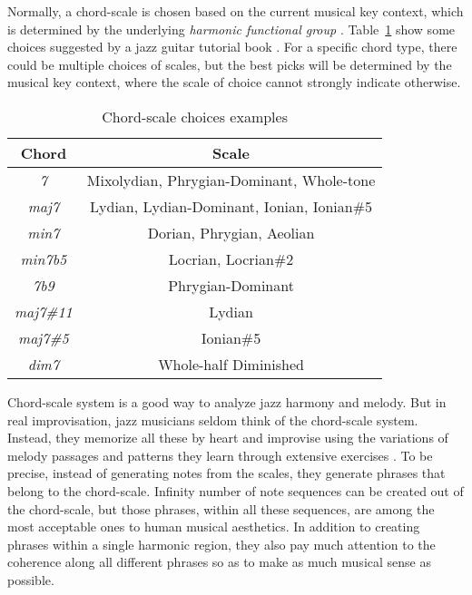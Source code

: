 Normally, a chord-scale is chosen based on the current musical key context, which is determined by the underlying {\it harmonic functional group} \cite{hojnackijazz,levine2011jazztheory}. Table~\ref{tab:5-chordscale} show some choices suggested by a jazz guitar tutorial book \cite{jazzguitarbook}. For a specific chord type, there could be multiple choices of scales, but the best picks will be determined by the musical key context, where the scale of choice cannot strongly indicate otherwise.
\begin{table}
\centering
\footnotesize
\begin{tabular}{|c|c|} \hline
Chord & Scale \\ \hline
\textit{7} & Mixolydian, Phrygian-Dominant, Whole-tone \\ \hline
\textit{maj7} & Lydian, Lydian-Dominant, Ionian, Ionian\#5 \\ \hline
\textit{min7} & Dorian, Phrygian, Aeolian \\ \hline
\textit{min7b5} & Locrian, Locrian\#2 \\ \hline
\textit{7b9} & Phrygian-Dominant \\ \hline
\textit{maj7\#11} & Lydian \\ \hline
\textit{maj7\#5} & Ionian\#5 \\ \hline
\textit{dim7} & Whole-half Diminished \\ \hline
\end{tabular}
\caption{Chord-scale choices examples}
\label{tab:5-chordscale}
\end{table}

Chord-scale system is a good way to analyze jazz harmony and melody. But in real improvisation, jazz musicians seldom think of the chord-scale system. Instead, they memorize all these by heart and improvise using the variations of melody passages and patterns they learn through extensive exercises \cite{jazzguitarimpro}. To be precise, instead of generating notes from the scales, they generate phrases that belong to the chord-scale. Infinity number of note sequences can be created out of the chord-scale, but those phrases, within all these sequences, are among the most acceptable ones to human musical aesthetics. In addition to creating phrases within a single harmonic region, they also pay much attention to the coherence along all different phrases so as to make as much musical sense as possible.

